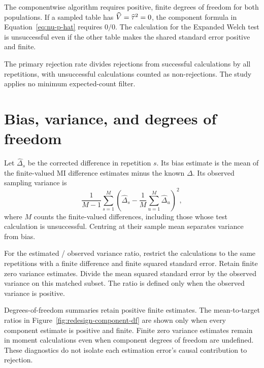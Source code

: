 The componentwise algorithm requires positive, finite degrees of freedom
for both populations. If a sampled table has
\(\widehat V=\widehat\tau^2=0\), the component formula in
Equation~\eqref{eq:nu-p-hat} requires \(0/0\). The calculation for the Expanded
Welch test is unsuccessful even if the other table makes the shared standard
error positive and finite.

The primary rejection rate divides rejections from successful calculations
by all repetitions, with unsuccessful calculations counted as non-rejections.
The study applies no minimum expected-count filter.

\section{Bias, variance, and degrees of freedom}
\label{sec:estimation-diagnostics}

Let \(\widehat\Delta_s\) be the corrected difference in repetition
\(s\). Its bias estimate is the mean of the finite-valued MI difference
estimates minus the known \(\Delta\). Its observed sampling variance is
\begin{equation}
 \frac{1}{M-1}\sum_{s=1}^M
 \left(\widehat\Delta_s-\frac{1}{M}\sum_{u=1}^M\widehat\Delta_u\right)^2,
 \label{eq:observed-sampling-variance}
\end{equation}
where \(M\) counts the finite-valued differences, including those whose
test calculation is unsuccessful. Centring at their sample mean separates
variance from bias.

For the estimated / observed variance ratio, restrict the calculations to
the same repetitions with a finite difference and finite squared
standard error. Retain finite zero variance estimates. Divide the mean
squared standard error by the observed variance on this matched subset.
The ratio is defined only when the observed variance is positive.

Degrees-of-freedom summaries retain positive finite estimates.
The mean-to-target ratios in Figure~\ref{fig:redesign-component-df}
are shown only when every component estimate is positive and finite.
Finite zero variance estimates remain in moment calculations even when
component degrees of freedom are undefined. These diagnostics do not isolate
each estimation error's causal contribution to rejection.

\medskip
{}

